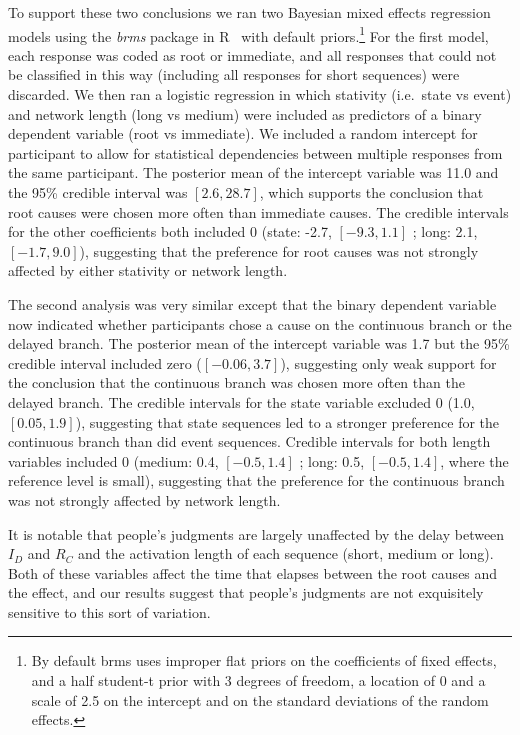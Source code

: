 \documentclass[10pt,letterpaper]{article}
\newcommand{\ev}[2]{$#1_#2$}
\begin{document}
To support these two conclusions we ran two Bayesian mixed effects regression models using the \emph{brms} package in R~\cite{brms} with default priors.\footnote{By default brms uses improper flat priors on the coefficients of fixed effects, and a half student-t prior with 3 degrees of freedom, a location of 0 and a scale of 2.5 on the intercept and on the standard deviations of the random effects.} For the first model, each response was coded as root or immediate, and all responses that could not be classified in this way (including all responses for short sequences) were discarded. We then ran a logistic regression in which stativity (i.e.\ state vs event) and network length (long vs medium) were included as predictors of a binary dependent variable (root vs immediate). We included a random intercept for participant to allow for statistical dependencies between multiple responses from the same participant. The posterior mean of the intercept variable was 11.0 and the 95\% credible interval was $[2.6, 28.7]$, which supports the conclusion that root causes were chosen more often than immediate causes. The credible intervals for the other coefficients both included 0 (state: -2.7, $[-9.3, 1.1]$ ; long: 2.1, $[-1.7, 9.0]$), suggesting that the preference for root causes was not strongly affected by either stativity or network length. 

The second analysis was very similar except that the binary dependent variable now indicated whether participants chose a cause on the continuous branch or the delayed branch. The posterior mean of the intercept variable was 1.7 but the 95\% credible interval included zero ($[-0.06, 3.7]$), suggesting only weak support for the conclusion that the continuous branch was chosen more often than the delayed branch. The credible intervals for the state variable excluded 0 (1.0, $[0.05, 1.9]$), suggesting that state sequences led to a stronger preference for the continuous branch than did event sequences.    Credible intervals for both length variables included 0 (medium: 0.4, $[-0.5,1.4]$ ; long: 0.5, $[-0.5,1.4]$, where the reference level is small), suggesting that the preference for the continuous branch was not strongly affected by network length. 

It is notable that people's judgments are largely unaffected by the delay between \ev{I}{D} and \ev{R}{C} and the activation length of each sequence (short, medium or long). Both of these variables affect the time that elapses between the root causes and the effect, and our results suggest that people's judgments are not exquisitely sensitive to this sort of variation.
\end{document}
